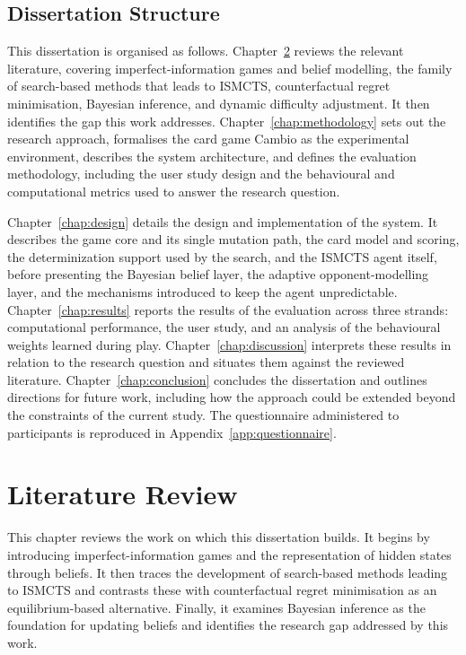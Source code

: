 \documentclass[12pt,a4paper,oneside]{report}
\begin{document}
\section{Dissertation Structure}

This dissertation is organised as follows. Chapter~\ref{chap:litreview}
reviews the relevant literature, covering imperfect-information games and belief modelling,
the family of search-based methods that leads to ISMCTS, counterfactual regret
minimisation, Bayesian inference, and dynamic difficulty adjustment.  It then identifies the gap this work addresses. Chapter~\ref{chap:methodology} sets out the research approach,
formalises the card game Cambio as the experimental environment, describes the system
architecture, and defines the evaluation methodology, including the user study design and
the behavioural and computational metrics used to answer the research question.

Chapter~\ref{chap:design} details the design and implementation of the system. It describes
the game core and its single mutation path, the card model and scoring, the determinization
support used by the search, and the ISMCTS agent itself, before presenting the Bayesian
belief layer, the adaptive opponent-modelling layer, and the mechanisms introduced to keep
the agent unpredictable. Chapter~\ref{chap:results} reports the results of the evaluation
across three strands: computational performance, the user study, and an analysis of the
behavioural weights learned during play. Chapter~\ref{chap:discussion} interprets these
results in relation to the research question and situates them against the reviewed
literature. Chapter~\ref{chap:conclusion} concludes the dissertation and outlines directions
for future work, including how the approach could be extended beyond the constraints of the
current study. The questionnaire administered to participants is reproduced in
Appendix~\ref{app:questionnaire}.



\chapter{Literature Review}\label{chap:litreview}
\label{ch:litreview}

This chapter reviews the work on which this dissertation builds. It begins by introducing imperfect-information games and the representation of hidden states through beliefs. It then traces the development of search-based methods leading to ISMCTS and contrasts these with counterfactual regret minimisation as an equilibrium-based alternative. Finally, it examines Bayesian inference as the foundation for updating beliefs and identifies the research gap addressed by this work.
\end{document}
